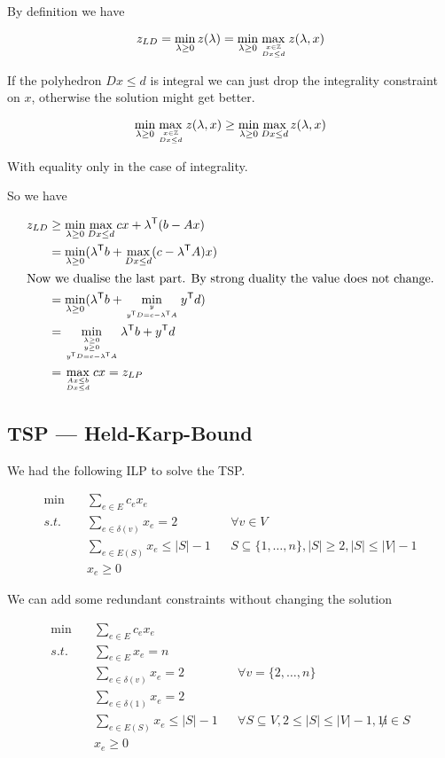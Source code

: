 \begin{pr} By definition we have

\[z_{LD} = \min_{\lambda \geq 0} z(\lambda) = \min_{\lambda\geq 0} \max_{{x\in \mathbb{Z}}\atop {Dx\leq d}} z(\lambda,x)\]

If the polyhedron $Dx\leq d$ is integral we can just drop the integrality constraint on $x$, otherwise the solution might get better.

\[\min_{\lambda\geq 0} \max_{{x\in \mathbb{Z}}\atop {Dx\leq d}} z(\lambda,x) \geq \min_{\lambda\geq 0} \max_{Dx\leq d} z(\lambda,x)\]

With equality only in the case of integrality.

So we have

\begin{align*}
z_{LD} &\geq \min_{\lambda\geq 0} \max_{Dx\leq d} cx+ {\lambda}^\text{\upshape \sffamily T}(b-Ax)\\
	& = \min_{\lambda \geq 0} ({\lambda}^\text{\upshape \sffamily T}b+\max_{Dx\leq d}(c-{\lambda}^\text{\upshape \sffamily T}A)x)\\
\intertext{Now we dualise the last part. By strong duality the value does not change.}
	& = \min_{\lambda \geq 0} ({\lambda}^\text{\upshape \sffamily T} b+\min_{y\atop {{y}^\text{\upshape \sffamily T}D=c-{\lambda}^\text{\upshape \sffamily T}A}} {y}^\text{\upshape \sffamily T} d)\\
	&= \min_{{{\lambda \geq 0}\atop {y\geq 0}}\atop {{y}^\text{\upshape \sffamily T}D=c-{\lambda}^\text{\upshape \sffamily T}A}} {\lambda}^\text{\upshape \sffamily T} b+ {y}^\text{\upshape \sffamily T} d\\
	&=\max_{{Ax\leq b}\atop {Dx\leq d}} cx = z_{LP}
\end{align*}
\end{pr}

\subsection{TSP --- Held-Karp-Bound}

We had the following ILP to solve the TSP.

\begin{align*}
\min \quad & \sum_{e\in E} c_{e}x_{e}\\
s.t. \quad & \sum_{e\in \delta(v)} x_{e} = 2 && \forall v\in V\\
	& \sum_{e\in E(S)} x_{e} \leq |S|-1 && S \subseteq \{1,\ldots,n\}, |S|\geq 2, |S| \leq |V|-1\\
	& x_{e} \geq  0
\end{align*}

We can add some redundant constraints without changing the solution

\begin{align*}
\min \quad & \sum_{e\in E} c_{e}x_{e}\\
s.t. \quad & \sum_{e\in E} x_e = n\\
	&\sum_{e\in \delta(v)} x_e=2 && \forall v=\{2,\ldots,n\}\\
	&\sum_{e\in \delta(1)} x_e=2\\
	&\sum_{e\in E(S)} x_e \leq |S|-1 && \forall S \subseteq V, 2\leq |S|\leq |V|-1,1\not i\in S\\
	& x_{e} \geq  0
\end{align*}


